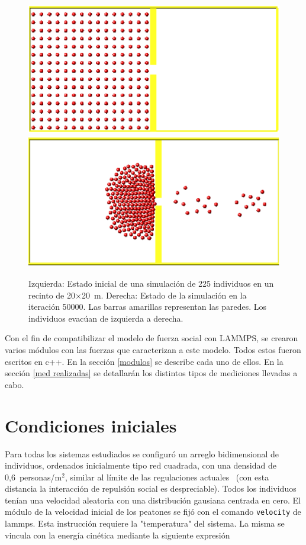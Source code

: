 \begin{figure}[H]
    \centering
    \includegraphics[scale=0.45]{figuras/0.eps}
    \hfill   
    \includegraphics[scale=0.45]{figuras/500.eps}
     \caption[width=5cm]{Izquierda: Estado inicial de una simulación de 225 individuos en un recinto de 20$\times$20~m. Derecha: Estado de la simulación en la iteración 50000. Las barras amarillas representan las paredes. Los individuos evacúan de izquierda a derecha.}
    \label{sim}
\end{figure}

Con el fin de compatibilizar el modelo de fuerza social con LAMMPS, se crearon varios módulos con las fuerzas que caracterizan a este modelo. Todos estos fueron escritos en c++. En la  sección \ref{modulos} se describe cada uno de ellos. 
En la sección \ref{med realizadas} se detallarán los distintos tipos de mediciones llevadas a cabo.

\section{\label{ci}Condiciones iniciales}

Para todas los sistemas estudiados se configuró un arreglo bidimensional de individuos, ordenados inicialmente tipo red cuadrada, con una densidad de 0,6~personas/m$^2$, similar al límite de las regulaciones actuales~\cite{mysen} (con esta distancia la interacción de repulsión social es despreciable). Todos los individuos tenían una velocidad aleatoria con una distribución gausiana centrada en cero. El módulo de la velocidad inicial de los peatones se fijó con el comando {\tt velocity} de lammps. Esta instrucción requiere la "temperatura" del sistema. La misma se vincula con la energía cinética mediante la siguiente expresión

